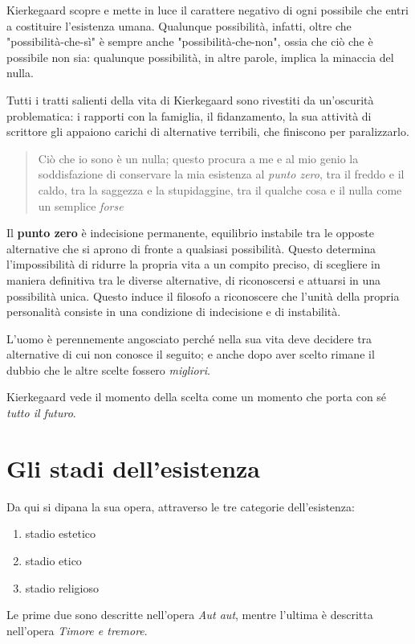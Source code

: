 \documentclass[a4paper, twoside, titlepage]{book}
\newcommand{\citazione}[1]{%
  \begin{quotation}
  #1
  \end{quotation}}
\begin{document}
Kierkegaard scopre e mette in luce il carattere negativo di ogni possibile che entri a costituire l'esistenza umana. Qualunque possibilità, infatti, oltre che "possibilità-che-sì" è sempre anche "possibilità-che-non", ossia che ciò che è possibile non sia: qualunque possibilità, in altre parole, implica la minaccia del nulla.

Tutti i tratti salienti della vita di Kierkegaard sono rivestiti da un'oscurità problematica: i rapporti con la famiglia, il fidanzamento, la sua attività di scrittore gli appaiono carichi di alternative terribili, che finiscono per paralizzarlo.

\citazione{Ciò che io sono è un nulla; questo procura a me e al mio genio la soddisfazione di conservare la mia esistenza al \textit{punto zero}, tra il freddo e il caldo, tra la saggezza e la stupidaggine, tra il qualche cosa e il nulla come un semplice \textit{forse}}

Il \textbf{punto zero} è indecisione permanente, equilibrio instabile tra le opposte alternative che si aprono di fronte a qualsiasi possibilità. Questo determina l'impossibilità di ridurre la propria vita a un compito preciso, di scegliere in maniera definitiva tra le diverse alternative, di riconoscersi e attuarsi in una possibilità unica. Questo induce il filosofo a riconoscere che l'unità della propria personalità consiste in una condizione di indecisione e di instabilità.

L'uomo è perennemente angosciato perché nella sua vita deve decidere tra alternative di cui non conosce il seguito; e anche dopo aver scelto rimane il dubbio che le altre scelte fossero \textit{migliori}.

Kierkegaard vede il momento della scelta come un momento che porta con sé \textit{tutto il futuro}.

\chapter{Gli stadi dell'esistenza}

Da qui si dipana la sua opera, attraverso le tre categorie dell'esistenza:
\begin{enumerate}
\item stadio estetico
\item stadio etico
\item stadio religioso
\end{enumerate}

Le prime due sono descritte nell'opera \textit{Aut aut}, mentre l'ultima è descritta nell'opera \textit{Timore e tremore}.
\end{document}
